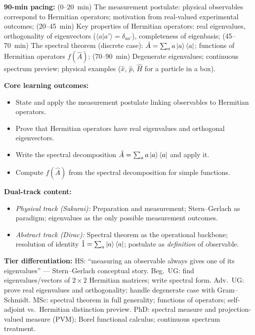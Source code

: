 \documentclass[11pt,a4paper]{article}
\begin{document}
\medskip

\begin{tcolorbox}[modulebox, title={Module~I.1 / L03: Observables, Hermitian Operators, and the Spectral Theorem}]
\textbf{90-min pacing:} (0--20~min) The measurement postulate: physical observables correspond to Hermitian operators;
motivation from real-valued experimental outcomes;
(20--45~min) Key properties of Hermitian operators: real eigenvalues, orthogonality of eigenvectors
($\langle a|a'\rangle = \delta_{aa'}$), completeness of eigenbasis;
(45--70~min) The spectral theorem (discrete case): $\hat{A} = \sum_a a\ket{a}\bra{a}$;
functions of Hermitian operators $f(\hat{A})$;
(70--90~min) Degenerate eigenvalues; continuous spectrum preview; physical examples
($\hat{x}$, $\hat{p}$, $\hat{H}$ for a particle in a box).

\medskip\textbf{Core learning outcomes:}
\begin{itemize}[leftmargin=1.4em,topsep=2pt,itemsep=1pt]
  \item State and apply the measurement postulate linking observables to Hermitian operators.
  \item Prove that Hermitian operators have real eigenvalues and orthogonal eigenvectors.
  \item Write the spectral decomposition $\hat{A}=\sum_a a\ket{a}\bra{a}$ and apply it.
  \item Compute $f(\hat{A})$ from the spectral decomposition for simple functions.
\end{itemize}

\medskip\textbf{Dual-track content:}
\begin{itemize}[leftmargin=1.4em,topsep=2pt,itemsep=1pt]
  \item \textit{Physical track (Sakurai):} Preparation and measurement; Stern--Gerlach as paradigm;
    eigenvalues as the only possible measurement outcomes.
  \item \textit{Abstract track (Dirac):} Spectral theorem as the operational backbone; resolution of
    identity $\hat{1}=\sum_a\ket{a}\bra{a}$; postulate as \emph{definition} of observable.
\end{itemize}

\medskip\textbf{Tier differentiation:}
HS: ``measuring an observable always gives one of its eigenvalues'' --- Stern--Gerlach conceptual story.
Beg.\ UG: find eigenvalues/vectors of $2\times 2$ Hermitian matrices; write spectral form.
Adv.\ UG: prove real eigenvalues and orthogonality; handle degenerate case with Gram--Schmidt.
MSc: spectral theorem in full generality; functions of operators; self-adjoint vs.\ Hermitian distinction preview.
PhD: spectral measure and projection-valued measure (PVM); Borel functional calculus; continuous spectrum treatment.


\end{tcolorbox}
\end{document}
